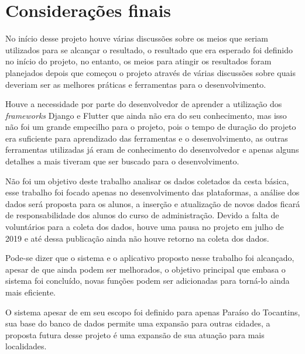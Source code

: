 \documentclass{ifto-tex}
\begin{document}
\chapter{Considerações finais}
No início desse projeto houve várias discussões sobre os meios que seriam utilizados para se alcançar o
resultado, o resultado que era esperado foi definido no início do projeto, no entanto, os meios para atingir os
resultados foram planejados depois que começou o projeto através de várias discussões sobre quais deveriam ser as
melhores práticas e ferramentas para o desenvolvimento.

Houve a necessidade por parte do desenvolvedor de aprender a utilização dos \textit{frameworks} Django e Flutter que ainda
não era do seu conhecimento, mas isso não foi um grande empecilho para o projeto, pois o tempo de duração do
projeto era suficiente para aprendizado das ferramentas e o desenvolvimento, as outras ferramentas utilizadas já eram
de conhecimento do desenvolvedor e apenas alguns detalhes a mais tiveram que ser buscado para o
desenvolvimento.

Não foi um objetivo deste trabalho analisar os dados coletados da cesta básica, esse trabalho foi focado
apenas no desenvolvimento das plataformas, a análise dos dados será proposta para os alunos, a inserção e atualização de novos dados ficará de responsabilidade dos alunos do
curso de administração. Devido a falta de voluntários para a coleta dos dados, houve uma pausa no projeto em julho de 2019 e até dessa publicação ainda não houve retorno na coleta dos dados.

Pode-se dizer que o sistema e o aplicativo proposto nesse trabalho foi alcançado, apesar de que ainda podem ser
melhorados, o objetivo principal que embasa o sistema foi concluído, novas funções podem ser adicionadas para
torná-lo ainda mais eficiente.

O sistema apesar de em seu escopo foi definido para apenas Paraíso do Tocantins, sua base do banco de
dados permite uma expansão para outras cidades, a proposta futura desse projeto é uma expansão de sua atuação
para mais localidades.



\postextual
\end{document}

